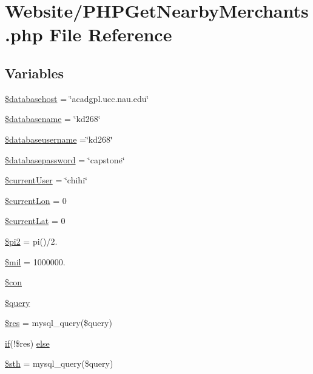 \hypertarget{_p_h_p_get_nearby_merchants_8php}{\section{Website/\-P\-H\-P\-Get\-Nearby\-Merchants.php File Reference}
\label{_p_h_p_get_nearby_merchants_8php}
}
\subsection*{Variables}
\begin{DoxyCompactItemize}
\item 
\hyperlink{_p_h_p_get_nearby_merchants_8php_a034ead57b6864a4413371711e8d65372}{\$databasehost} = \char`\"{}acadgpl.\-ucc.\-nau.\-edu\char`\"{}
\item 
\hyperlink{_p_h_p_get_nearby_merchants_8php_aace53f8afce81b52040cef0cd850138a}{\$databasename} = \char`\"{}kd268\char`\"{}
\item 
\hyperlink{_p_h_p_get_nearby_merchants_8php_a251bf75f510d7c8b556c65d7c30e911f}{\$databaseusername} =\char`\"{}kd268\char`\"{}
\item 
\hyperlink{_p_h_p_get_nearby_merchants_8php_a1a07536b6a5f43f2d8f826bd2ee6c91a}{\$databasepassword} = \char`\"{}capstone\char`\"{}
\item 
\hyperlink{_p_h_p_get_nearby_merchants_8php_a478a2fc0252b087f8bc01921fef09b78}{\$current\-User} = \char`\"{}chihi\char`\"{}
\item 
\hyperlink{_p_h_p_get_nearby_merchants_8php_a2b363dae502590ee3a970876a7fe4ef8}{\$current\-Lon} = 0
\item 
\hyperlink{_p_h_p_get_nearby_merchants_8php_ade4a9a789a5dd277c6416ce0956205de}{\$current\-Lat} = 0
\item 
\hyperlink{_p_h_p_get_nearby_merchants_8php_af469a8b11a566ce9fbd4e856f3cd8282}{\$pi2} = pi()/2.
\item 
\hyperlink{_p_h_p_get_nearby_merchants_8php_a6bb435d1aeba7b0eb488140d4913b17f}{\$mil} = 1000000.
\item 
\hyperlink{_p_h_p_get_nearby_merchants_8php_a0debe10448ec56a57b5509648408a549}{\$con}
\item 
\hyperlink{_p_h_p_get_nearby_merchants_8php_af59a5f7cd609e592c41dc3643efd3c98}{\$query}
\item 
\hyperlink{_p_h_p_get_nearby_merchants_8php_a49a8a4009b02e49717caa88b128affc5}{\$res} = mysql\-\_\-query(\$query)
\item 
\hyperlink{_m_c_mhome_page_8php_a8dec719c1645067d1065f7f064d4b967}{if}(!\$res) \hyperlink{_p_h_p_get_nearby_merchants_8php_acd5fe7f2086f786c96623b819503b734}{else}
\item 
\hyperlink{_p_h_p_get_nearby_merchants_8php_afa9126f9664959c02795be300a135f93}{\$sth} = mysql\-\_\-query(\$query)
\end{DoxyCompactItemize}



